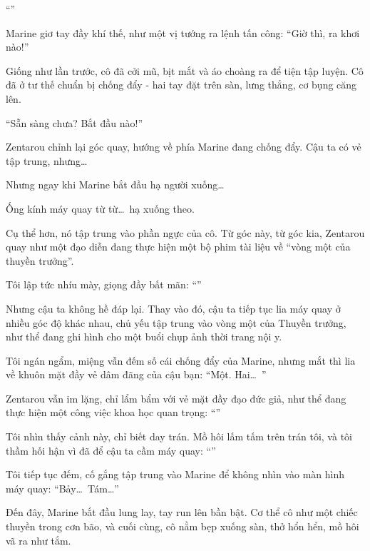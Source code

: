 \documentclass[../main.tex]{subfiles}
\begin{document}
``''

Marine giơ tay đầy khí thế, như một vị tướng ra lệnh tấn công: ``Giờ thì, ra khơi nào!''

\ct

Giống như lần trước, cô đã cởi mũ, bịt mắt và áo choàng ra để tiện tập luyện. Cô đã ở tư thế chuẩn bị chống đẩy - hai tay đặt trên sàn, lưng thẳng, cơ bụng căng lên.

``Sẵn sàng chưa? Bắt đầu nào!''


Zentarou chỉnh lại góc quay, hướng về phía Marine đang chống đẩy. Cậu ta có vẻ tập trung, nhưng\dots

Nhưng ngay khi Marine bắt đầu hạ người xuống\dots

Ống kính máy quay từ từ\dots\ hạ xuống theo.

Cụ thể hơn, nó tập trung vào phần ngực của cô. Từ góc này, từ góc kia, Zentarou quay như một đạo diễn đang thực hiện một bộ phim tài liệu về ``vòng một của thuyền trưởng''.

Tôi lập tức nhíu mày, giọng đầy bất mãn: ``''

Nhưng cậu ta không hề đáp lại. Thay vào đó, cậu ta tiếp tục lia máy quay ở nhiều góc độ khác nhau, chủ yếu tập trung vào vòng một của Thuyền trưởng, như thể đang ghi hình cho một buổi chụp ảnh thời trang nội y.

Tôi ngán ngẩm, miệng vẫn đếm số cái chống đẩy của Marine, nhưng mắt thì lia về khuôn mặt đầy vẻ dâm đãng của cậu bạn: ``Một. Hai\dots\ ''

Zentarou vẫn im lặng, chỉ lẩm bẩm với vẻ mặt đầy đạo đức giả, như thể đang thực hiện một công việc khoa học quan trọng: ``''

Tôi nhìn thấy cảnh này, chỉ biết day trán. Mồ hôi lấm tấm trên trán tôi, và tôi thầm hối hận vì đã để cậu ta cầm máy quay: ``''

\ct

Tôi tiếp tục đếm, cố gắng tập trung vào Marine để không nhìn vào màn hình máy quay: ``Bảy\dots\ Tám\dots''

Đến đây, Marine bắt đầu lung lay, tay run lên bần bật. Cơ thể cô như một chiếc thuyền trong cơn bão, và cuối cùng, cô nằm bẹp xuống sàn, thở hổn hển, mồ hôi vã ra như tắm.
\end{document}
